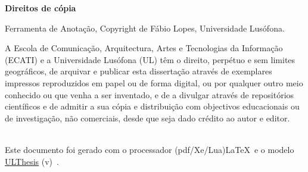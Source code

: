 \thispagestyle{plain}

\vspace*{\fill}

\begin{flushleft}
\rmfamily
{\fontsize{14}{1.15}\selectfont
    \textbf{Direitos de cópia}
}
\vspace{2\baselineskip}

\normalsize{{Ferramenta de Anotação}, Copyright de {Fábio Lopes}, Universidade Lusófona.

A Escola de Comunicação, Arquitectura, Artes e Tecnologias da Informação (ECATI) e a Universidade Lusófona (UL) têm o direito, perpétuo e sem limites geográficos, de arquivar e publicar esta dissertação através de exemplares impressos reproduzidos em papel ou de forma digital, ou por qualquer outro meio conhecido ou que venha a ser inventado, e de a divulgar através de repositórios científicos e de admitir a sua cópia e distribuição com objectivos educacionais ou de investigação, não comerciais, desde que seja dado crédito ao autor e editor.}\\
Este documento foi gerado com o processador (pdf/Xe/Lua)\LaTeX\ e o modelo \href{https://github.com/joaomlourenco/novathesis}{ULThesis} (v\ulthesisversion)~\cite{ulthesis-manual}.
\end{flushleft}